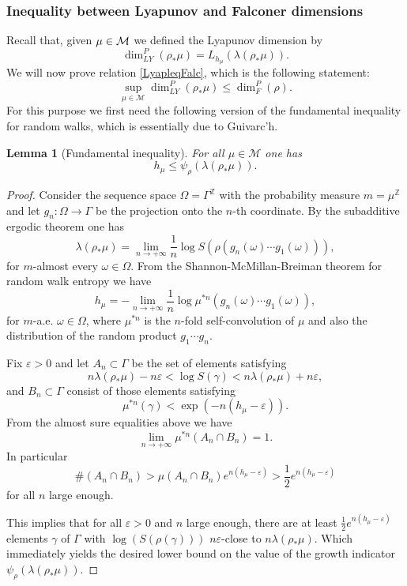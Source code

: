 \documentclass[10pt]{amsart}
\let\epsilon\varepsilon
\newtheorem{lemma}[theorem]{Lemma}
\newcommand{\Z}{\mathbb{Z}}
\let\e\varepsilon
\let\G\Gamma
\let\g\gamma
\begin{document}
\subsubsection{Inequality between Lyapunov and Falconer dimensions\label{proofLyap}}

Recall that, given \(\mu \in\nobreak \mathcal{M}\) we defined the Lyapunov dimension by
\[
\dim_{LY}^P(\rho_\ast \mu) = L_{h_\mu}(\lambda(\rho_*\mu)).
\]
We will now prove relation \eqref{LyapleqFalc}, which is the following statement:
\[
\sup_{\mu \in \mathcal{M}}\dim_{LY}^P(\rho_\ast \mu) \le \dim_F^P(\rho).
\]
For this purpose we first need the following version of the fundamental inequality for random walks, which is essentially due to Guivarc'h.

\begin{lemma}[Fundamental inequality]
For all \(\mu \in \mathcal{M}\) one has
\[
h_\mu \le \psi_{\rho}(\lambda(\rho_*\mu)).
\]
\end{lemma}
\begin{proof}
Consider the sequence space \(\Omega = \Gamma^{\Z}\) with the probability measure \(m = \mu^\Z\) and let \(g_n:\Omega \to \Gamma\) be the projection onto the \(n\)-th coordinate.
By the subadditive ergodic theorem \cite{Ose68} one has
\[
\lambda(\rho_*\mu) = \lim_{n \to +\infty}\frac{1}{n}\log S(\rho(g_n(\omega)\cdots g_1(\omega))),
\]
for \(m\)-almost every \(\omega \in \Omega\).
From the Shannon-McMillan-Breiman theorem for random walk entropy \cite{KV83} we have
\[
h_\mu = -\lim_{n \to +\infty}\frac{1}{n}\log \mu^{\ast n}(g_n(\omega)\cdots g_1(\omega)),
\]
for \(m\)-a.e. \(\omega \in \Omega\), where \(\mu^{\ast n}\) is the \(n\)-fold self-convolution of \(\mu\) and also the distribution of the random product \(g_1 \cdots g_n\).

Fix \(\epsilon > 0\) and let \(A_n \subset \Gamma\) be the set of elements satisfying
\[
n\lambda(\rho_*\mu) - n\epsilon < \log S(\gamma) < n\lambda(\rho_*\mu) + n\epsilon,
\]
and \(B_n \subset \Gamma\) consist of those elements satisfying
\[
\mu^{\ast n}(\gamma) < \exp(-n(h_\mu - \epsilon)).
\]
From the almost sure equalities above we have
\[
\lim_{n \to +\infty}\mu^{\ast n}(A_n \cap B_n) = 1.
\]
In particular
\[
\# (A_n \cap B_n) > \mu(A_n \cap B_n)e^{n(h_\mu - \epsilon)} > \frac{1}{2}e^{n(h_\mu - \epsilon)}
\]
for all \(n\) large enough.

This implies that for all \(\epsilon >0\) and \(n\) large enough, there are at least \(\frac{1}{2}e^{n(h_\mu -\e)}\) elements \(\g\) of \(\G\) with \(\log(S(\rho(\gamma)))\) \(n \e\)-close to \(n\lambda (\rho_*\mu)\). Which immediately yields the desired lower bound on the value of the growth indicator \(\psi_{\rho}(\lambda(\rho_*\mu))\).
\end{proof}
\end{document}
